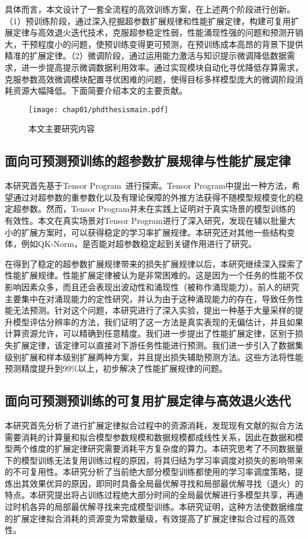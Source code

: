 具体而言，本文设计了一套全流程的高效训练方案，在上述两个阶段进行创新。（1）预训练阶段，通过深入挖掘超参数扩展规律和性能扩展定律，构建可复用扩展定律与高效退火迭代技术，克服超参稳定性弱，性能涌现性强的问题和预测开销大，干预程度小的问题，使预训练变得更可预测，在预训练成本高昂的背景下提供精准的扩展定律。（2）微调阶段，通过运用能力激活与知识提示微调降低数据需求，进一步提高提示微调数据利用效率。通过实现模块自动化寻优降低存算需求，克服参数高效微调模块配置寻优困难的问题，使得目标多样模型庞大的微调阶段消耗资源大幅降低。下面简要介绍本文的主要贡献。

\begin{figure}
  \centering
  \texttt{[image: chap01/phdthesismain.pdf]}
  \label{fig:mainframework}
  \caption{本文主要研究内容}
  \end{figure}

  
\subsection{面向可预测预训练的超参数扩展规律与性能扩展定律}
本研究首先基于Tensor Program~\cite{yang2022tensor}进行探索。Tensor Program中提出一种方法，希望通过对超参数的重参数化以及有理论保障的外推方法获得不随模型规模变化的稳定超参数。然而，Tensor Program并未在实践上证明对于真实场景的模型训练的有效性。本文在真实场景对Tensor Program进行了深入研究，发现在辅以批量大小的扩展方案时，可以获得稳定的学习率扩展规律。本研究还对其他一些结构变体，例如QK-Norm，是否能对超参数稳定起到关键作用进行了研究。

在得到了稳定的超参数扩展规律带来的损失扩展规律以后，本研究继续深入探索了性能扩展规律。性能扩展定律被认为是非常困难的。这是因为一个任务的性能不仅影响因素众多，而且还会表现出波动性和涌现性（被称作涌现能力）。前人的研究主要集中在对涌现能力的定性研究，并认为由于这种涌现能力的存在，导致任务性能无法预测。针对这个问题，本研究进行了深入实验，提出一种基于大量采样的提升模型评估分辨率的方法，我们证明了这一方法是真实表现的无偏估计，并且如果计算资源允许，可以精确到任意精度。我们进一步提出了性能扩展定律，区别于损失扩展定律，该定律可以直接对下游任务性能进行预测。我们进一步引入了数据集级别扩展和样本级别扩展两种方案，并且提出损失辅助预测方法。这些方法将性能预测精度提升到99\%以上，初步解决了性能扩展规律的问题。

\subsection{面向可预测预训练的可复用扩展定律与高效退火迭代}
本研究首先分析了进行扩展定律拟合过程中的资源消耗，发现现有文献的拟合方法需要消耗的计算量和拟合模型参数规模和数据规模都成线性关系，因此在数据和模型两个维度的扩展定律研究需要消耗平方复杂度的算力。本研究思考了不同数据量下的模型训练无法复用训练过程的原因，将其归结为学习率调度对损失的影响带来的不可复用性。本研究分析了当前绝大部分模型训练都使用的学习率调度策略，提炼出其效果优异的原因，即同时具备全局最优解寻找和局部最优解寻找（退火）的特点。本研究提出将占训练过程绝大部分时间的全局最优解进行多模型共享，再通过时机各异的局部最优解寻找来完成模型训练。本研究证明，这种方法使数据维度的扩展定律拟合消耗的资源变为常数量级，有效提高了扩展定律拟合过程的高效性。

